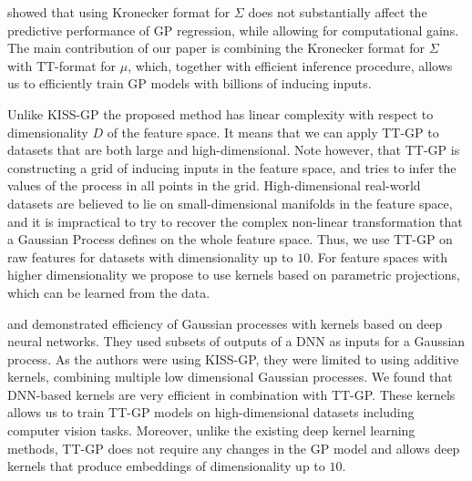 \citet{nickson2015} showed that using Kronecker
format for $\Sigma$ does not substantially affect the predictive performance
of GP regression, while allowing for computational gains. The main contribution
of our paper is combining the Kronecker format for $\Sigma$ with TT-format
for $\mu$, which, together with efficient inference procedure, allows us to
efficiently train GP models with billions of inducing inputs.

Unlike KISS-GP the proposed method has linear complexity with respect to 
dimensionality $D$ of the feature space. It means that we can apply TT-GP
to datasets that are both large and high-dimensional. Note however, that
TT-GP is constructing a grid of inducing inputs in the feature space, and
tries to infer the values of the process in all points in the grid. 
High-dimensional real-world datasets are believed to lie on small-dimensional
manifolds in the feature space, and it is impractical to try to recover the
complex non-linear transformation that a Gaussian Process defines on the 
whole feature space. Thus, we use TT-GP on raw features for datasets with
dimensionality up to $10$. For feature spaces with higher dimensionality
we propose to use kernels based on parametric projections, which can be learned
from the data.
 
\citet{wilson2016deep} and \citet{wilson2016stochastic}
demonstrated efficiency of Gaussian processes with kernels based on deep
neural networks. They used subsets of outputs of a DNN as
inputs for a Gaussian process. As the authors were using KISS-GP, they
were limited to using additive kernels, combining multiple low dimensional 
Gaussian processes. We found that DNN-based kernels are very efficient 
in combination with TT-GP. These kernels allows us to train TT-GP models
on high-dimensional datasets including computer vision tasks. Moreover,
unlike the existing deep kernel learning methods, TT-GP does not require
any changes in the GP model and allows deep kernels that produce embeddings
of dimensionality up to $10$.
